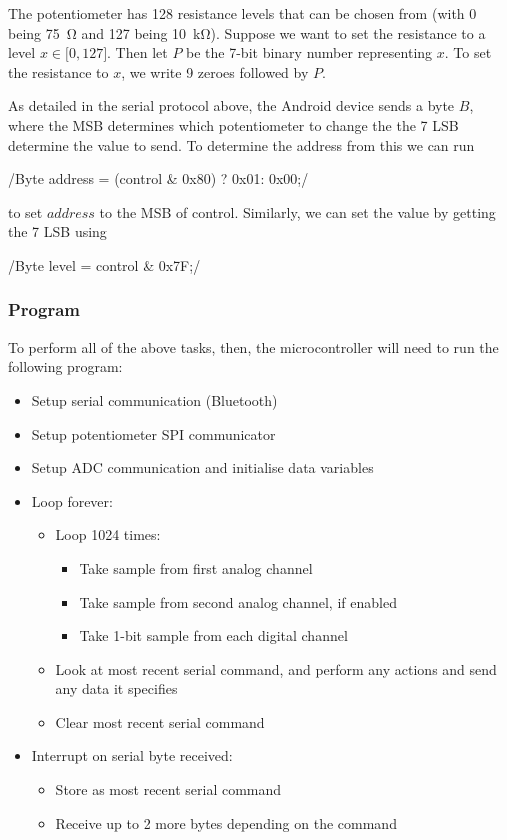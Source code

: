 The potentiometer has 128 resistance levels that can be chosen from (with 0
being \SI{75}{\ohm} and 127 being \SI{10}{\kilo\ohm}). Suppose we want to set
the resistance to a level $x \in \mathopen[0,127\mathclose]$. Then let $P$ be
the 7-bit binary number representing $x$. To set the resistance to $x$, we write
9 zeroes followed by $P$.

As detailed in the serial protocol above, the Android device sends a byte $B$,
where the MSB determines which potentiometer to change the the 7 LSB determine
the value to send. To determine the address from this we can run

/Byte address = (control & 0x80) ? 0x01: 0x00;/

to set $address$ to the MSB of control. Similarly, we can set the value by
getting the 7 LSB using

/Byte level = control & 0x7F;/


\subsubsection{Program}
To perform all of the above tasks, then, the microcontroller will need to run
the following program:

\begin{itemize}
  \item Setup serial communication (Bluetooth)
  \item Setup potentiometer SPI communicator
  \item Setup ADC communication and initialise data variables
  \item Loop forever:
    \begin{itemize}
      \item Loop 1024 times:
        \begin{itemize}
          \item Take sample from first analog channel
          \item Take sample from second analog channel, if enabled
          \item Take 1-bit sample from each digital channel
        \end{itemize}
      \item Look at most recent serial command, and perform any actions and send
      any data it specifies
      \item Clear most recent serial command
    \end{itemize}
  \item Interrupt on serial byte received:
    \begin{itemize}
      \item Store as most recent serial command
      \item Receive up to 2 more bytes depending on the command
    \end{itemize}
\end{itemize}

